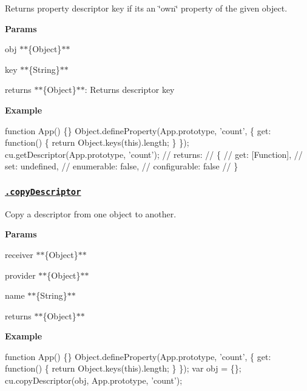 Returns property descriptor {\ttfamily key} if it\textquotesingle{}s an \char`\"{}own\char`\"{} property of the given object.

{\bfseries Params}


\begin{DoxyItemize}
\item {\ttfamily obj} $\ast$$\ast$\{Object\}$\ast$$\ast$
\item {\ttfamily key} $\ast$$\ast$\{String\}$\ast$$\ast$
\item {\ttfamily returns} $\ast$$\ast$\{Object\}$\ast$$\ast$\+: Returns descriptor {\ttfamily key}
\end{DoxyItemize}

{\bfseries Example}


\begin{DoxyCode}
function App() \{\}
Object.defineProperty(App.prototype, 'count', \{
  get: function() \{
    return Object.keys(this).length;
  \}
\});
cu.getDescriptor(App.prototype, 'count');
// returns:
// \{
//   get: [Function],
//   set: undefined,
//   enumerable: false,
//   configurable: false
// \}
\end{DoxyCode}


\subsubsection*{\href{index.js#L238}{\tt .copy\+Descriptor}}

Copy a descriptor from one object to another.

{\bfseries Params}


\begin{DoxyItemize}
\item {\ttfamily receiver} $\ast$$\ast$\{Object\}$\ast$$\ast$
\item {\ttfamily provider} $\ast$$\ast$\{Object\}$\ast$$\ast$
\item {\ttfamily name} $\ast$$\ast$\{String\}$\ast$$\ast$
\item {\ttfamily returns} $\ast$$\ast$\{Object\}$\ast$$\ast$
\end{DoxyItemize}

{\bfseries Example}


\begin{DoxyCode}
function App() \{\}
Object.defineProperty(App.prototype, 'count', \{
  get: function() \{
    return Object.keys(this).length;
  \}
\});
var obj = \{\};
cu.copyDescriptor(obj, App.prototype, 'count');
\end{DoxyCode}


